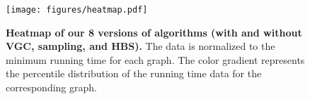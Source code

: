 \begin{figure}[!t]
  \centering
  \texttt{[image: figures/heatmap.pdf]}
  \caption{\label{fig:app:heatmap}\textbf{
    Heatmap of our 8 versions of algorithms (with and without VGC, sampling, and HBS). }
    The data is normalized to the minimum running time for each graph.
    The color gradient represents the percentile distribution of the running time data for the corresponding graph.
  }
\end{figure}
